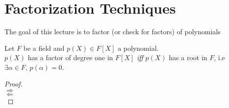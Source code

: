 \documentclass[../Main.tex]{subfiles}
\begin{document}
\chapter{Factorization Techniques}
The goal of this lecture is to factor (or check for factors) of polynomials

\begin{prop}
	Let $F$ be a field and $p(X)\in F[X]$ a polynomial.\\
	$p(X)$ has a factor of degree one in $F[X]$ \textit{iff} $p(X)$ has a root in $F$, i.e $\exists \alpha \in F,\, p(\alpha)=0$.
\end{prop}
\begin{proof}~\\
	$\Longrightarrow$\\
	$\Longleftarrow$\\
\end{proof}
\end{document}
